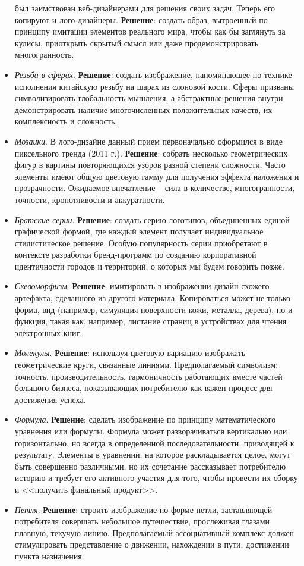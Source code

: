 \begin{itemize}
  был заимствован веб-дизайнерами для решения своих задач. Теперь его копируют и
  лого-дизайнеры. \textbf{Решение}: создать образ, вытроенный по принципу имитации элементов
  реального мира, чтобы как бы заглянуть за кулисы, приоткрыть скрытый смысл или даже
  продемонстрировать многогранность.
\item \emph{Резьба в сферах}. \textbf{Решение}: создать изображение,  напоминающее по технике
  исполнения китайскую резьбу на шарах из слоновой кости. Сферы призваны символизировать
  глобальность мышления, а абстрактные решения внутри демонстрировать наличие многочисленных
  положительных качеств, их комплексность и сложность.
\item \emph{Мозаики}. В лого-дизайне данный прием первоначально оформился в виде пиксельного
  тренда (2011 г.). \textbf{Решение}: собрать несколько геометрических фигур в картины
  повторяющихся узоров разной степени сложности. Часто элементы имеют общую цветовую гамму для
  получения эффекта наложения и прозрачности. Ожидаемое впечатление -- сила в количестве,
  многогранности, точности, кропотливости и аккуратности.
\item \emph{Братские серии}.  \textbf{Решение}: создать серию логотипов, объединенных единой
  графической формой, где каждый элемент получает индивидуальное стилистическое решение. Особую
  популярность серии приобретают в контексте разработки  бренд-программ по созданию корпоративной
  идентичности городов и территорий, о которых мы будем говорить позже.
\item \emph{Скевоморфизм}. \textbf{Решение}: имитировать в изображении дизайн схожего артефакта,
  сделанного  из другого материала. Копироваться может не только форма, вид (например, симуляция
  поверхности кожи, металла, дерева), но и функция, такая как, например, листание страниц в
  устройствах для чтения электронных книг.
\item \emph{Молекулы}. \textbf{Решение}: используя цветовую вариацию изображать геометрические
  круги, связанные линиями. Предполагаемый символизм: точность, производительность, гармоничность
  работающих вместе частей большого бизнеса, показывающих потребителю как важен процесс для
  достижения успеха.
\item \emph{Формула}. \textbf{Решение}: сделать изображение по принципу математического уравнения
  или формулы. Формула может разворачиваться вертикально или горизонтально, но всегда в
  определенной последовательности, приводящей к результату. Элементы в уравнении, на которое
  раскладывается целое, могут быть совершенно различными, но их сочетание рассказывает потребителю
  историю и требует его активного участия для того, чтобы провести их сборку и <<получить финальный
  продукт>>.
\item \emph{Петля}. \textbf{Решение}: строить изображение по форме петли, заставляющей потребителя
  совершать небольшое путешествие, прослеживая глазами плавную, текучую линию. Предполагаемый
  ассоциативный комплекс должен стимулировать представление о движении, нахождении в пути,
  достижении пункта назначения.
\end{itemize}

